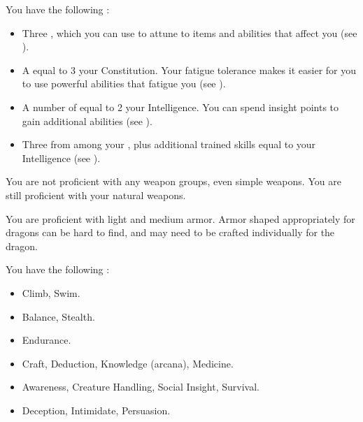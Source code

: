              You have the following :
            \begin{itemize}
                \item Three , which you can use to attune to items and abilities that affect you (see ).
                \item A  equal to 3 \add your Constitution.
                    Your fatigue tolerance makes it easier for you to use powerful abilities that fatigue you (see ).
                \item A number of  equal to 2 \add your Intelligence.
                    You can spend insight points to gain additional abilities (see ).
                \item Three  from among your , plus additional trained skills equal to your Intelligence (see ).
            \end{itemize}

            You are not proficient with any weapon groups, even simple weapons.
            You are still proficient with your natural weapons.

            You are proficient with light and medium armor.
            Armor shaped appropriately for dragons can be hard to find, and may need to be crafted individually for the dragon.

            You have the following :
            \begin{itemize}
                \item {} Climb, Swim.
                \item {} Balance, Stealth.
                \item {} Endurance.
                \item {} Craft, Deduction, Knowledge (arcana), Medicine.
                \item {} Awareness, Creature Handling, Social Insight, Survival.
                \item {} Deception, Intimidate, Persuasion.
            \end{itemize}

